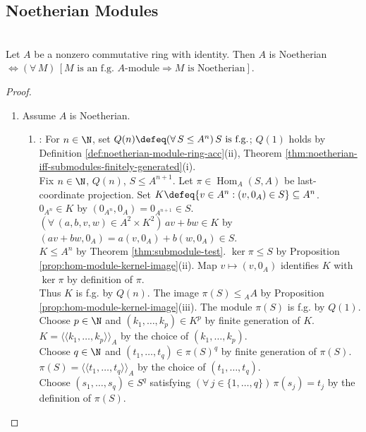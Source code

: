 \subsection{Noetherian Modules}

\begin{theorem} \label{thm:finitely-generated-modules-over-noetherian-rings} \\
Let $A$ be a nonzero commutative ring with identity. Then $A$ is Noetherian $\Longleftrightarrow(\forall\,M)\,[M\text{ is an f.g. }A\text{-module}\Rightarrow M\text{ is Noetherian}]$.
\begin{proof}
\begin{enumerate}[label=\roman*.]
\setlength{\itemsep}{0pt}
\item[$(\Rightarrow)$] Assume $A$ is Noetherian.
\begin{enumerate}[label=(\alph*)]
\setlength{\itemsep}{0pt}
\item {}: For $n\in\N$, set $Q(n)\defeq(\forall\,S\leq A^n)\,S\text{ is f.g.}$; $Q(1)$ holds by Definition \ref{def:noetherian-module-ring-acc}(ii), Theorem \ref{thm:noetherian-iff-submodules-finitely-generated}(i).\\
Fix $n\in\N$, $Q(n)$, $S\leq A^{n+1}$. Let $\pi\in\operatorname{Hom}_A(S,A)$ be last-coordinate projection. Set $K\defeq\{v\in A^n:(v,0_A)\in S\}\subseteq A^n$.\\
$0_{A^n}\in K$ by $(0_{A^n},0_A)=0_{A^{n+1}}\in S$. $(\forall\,(a,b,v,w)\in A^2\times K^2)\,av+bw\in K$ by $(av+bw,0_A)=a(v,0_A)+b(w,0_A)\in S$.\\
$K\leq A^n$ by Theorem \ref{thm:submodule-test}. $\ker\pi\leq S$ by Proposition \ref{prop:hom-module-kernel-image}(ii). Map $v\mapsto(v,0_A)$ identifies $K$ with $\ker\pi$ by definition of $\pi$.\\
Thus $K$ is f.g. by $Q(n)$. The image $\pi(S)\leq{}_A A$ by Proposition \ref{prop:hom-module-kernel-image}(iii). The module $\pi(S)$ is f.g. by $Q(1)$.\\
Choose $p\in\N$ and $(k_1,\ldots,k_p)\in K^p$ by finite generation of $K$. $K=\langle\!\langle k_1,\ldots,k_p\rangle\!\rangle_A$ by the choice of $(k_1,\ldots,k_p)$.\\
Choose $q\in\N$ and $(t_1,\ldots,t_q)\in\pi(S)^q$ by finite generation of $\pi(S)$. $\pi(S)=\langle\!\langle t_1,\ldots,t_q\rangle\!\rangle_A$ by the choice of $(t_1,\ldots,t_q)$.\\
Choose $(s_1,\ldots,s_q)\in S^q$ satisfying $(\forall\,j\in\{1,\ldots,q\})\,\pi(s_j)=t_j$ by the definition of $\pi(S)$.\\

\end{enumerate}
\end{enumerate}
\end{proof}
\end{theorem}

